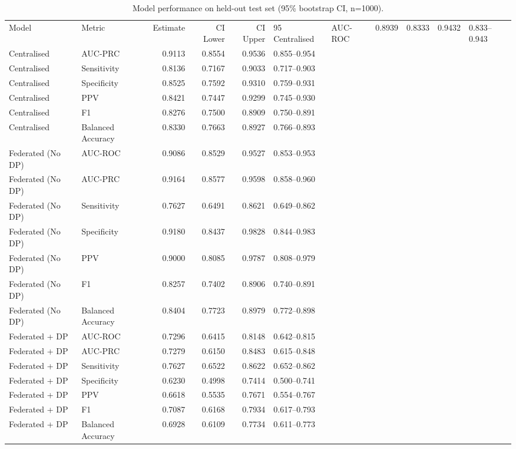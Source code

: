 \begin{table}
\caption{Model performance on held-out test set (95\% bootstrap CI, n=1000).}
\label{tab:metrics}
\begin{tabular}{llrrrl}
\toprule
Model & Metric & Estimate & CI Lower & CI Upper & 95%
\midrule
Centralised & AUC-ROC & 0.8939 & 0.8333 & 0.9432 & 0.833–0.943 \\
Centralised & AUC-PRC & 0.9113 & 0.8554 & 0.9536 & 0.855–0.954 \\
Centralised & Sensitivity & 0.8136 & 0.7167 & 0.9033 & 0.717–0.903 \\
Centralised & Specificity & 0.8525 & 0.7592 & 0.9310 & 0.759–0.931 \\
Centralised & PPV & 0.8421 & 0.7447 & 0.9299 & 0.745–0.930 \\
Centralised & F1 & 0.8276 & 0.7500 & 0.8909 & 0.750–0.891 \\
Centralised & Balanced Accuracy & 0.8330 & 0.7663 & 0.8927 & 0.766–0.893 \\
Federated (No DP) & AUC-ROC & 0.9086 & 0.8529 & 0.9527 & 0.853–0.953 \\
Federated (No DP) & AUC-PRC & 0.9164 & 0.8577 & 0.9598 & 0.858–0.960 \\
Federated (No DP) & Sensitivity & 0.7627 & 0.6491 & 0.8621 & 0.649–0.862 \\
Federated (No DP) & Specificity & 0.9180 & 0.8437 & 0.9828 & 0.844–0.983 \\
Federated (No DP) & PPV & 0.9000 & 0.8085 & 0.9787 & 0.808–0.979 \\
Federated (No DP) & F1 & 0.8257 & 0.7402 & 0.8906 & 0.740–0.891 \\
Federated (No DP) & Balanced Accuracy & 0.8404 & 0.7723 & 0.8979 & 0.772–0.898 \\
Federated + DP & AUC-ROC & 0.7296 & 0.6415 & 0.8148 & 0.642–0.815 \\
Federated + DP & AUC-PRC & 0.7279 & 0.6150 & 0.8483 & 0.615–0.848 \\
Federated + DP & Sensitivity & 0.7627 & 0.6522 & 0.8622 & 0.652–0.862 \\
Federated + DP & Specificity & 0.6230 & 0.4998 & 0.7414 & 0.500–0.741 \\
Federated + DP & PPV & 0.6618 & 0.5535 & 0.7671 & 0.554–0.767 \\
Federated + DP & F1 & 0.7087 & 0.6168 & 0.7934 & 0.617–0.793 \\
Federated + DP & Balanced Accuracy & 0.6928 & 0.6109 & 0.7734 & 0.611–0.773 \\
\bottomrule
\end{tabular}
\end{table}
